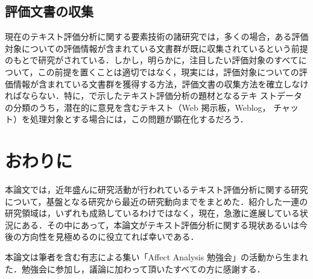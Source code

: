 \subsection{評価文書の収集}
\label{sec:collect}

現在のテキスト評価分析に関する要素技術の諸研究では，多くの場合，ある評価
対象についての評価情報が含まれている文書群が既に収集されているという前提
のもとで研究がされている．しかし，明らかに，注目したい評価対象のすべてに
ついて，この前提を置くことは適切ではなく，現実には，評価対象についての評
価情報が含まれている文書群を獲得する方法，評価文書の収集方法を確立しなけ
ればならない．特に，で示したテキスト評価分析の題材となるテキ
ストデータの分類のうち，潜在的に意見を含むテキスト（Web 掲示板，Weblog，
チャット）を処理対象とする場合には，この問題が顕在化するだろう．

\section{おわりに}
\label{sec:owarini}

本論文では，近年盛んに研究活動が行われているテキスト評価分析に関する研究
について，基盤となる研究から最近の研究動向までをまとめた．紹介した一連の
研究領域は，いずれも成熟しているわけではなく，現在，急激に進展している状
況にある．その中にあって，本論文がテキスト評価分析に関する現状あるいは今
後の方向性を見極めるのに役立てれば幸いである．


\acknowledgment

本論文は筆者を含む有志による集い「Affect Analysis 勉強会」の活動から生まれ
た．勉強会に参加し，議論に加わって頂いたすべての方に感謝する．

